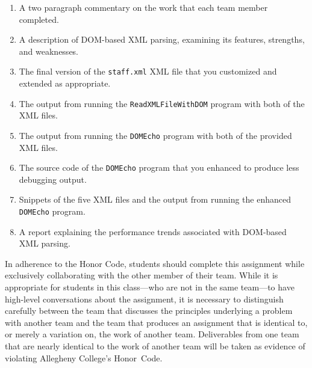 \vspace*{-.1in}
\begin{enumerate}
  \setlength{\itemsep}{0pt}
  \item A two paragraph commentary on the work that each team member completed. 
  \item A description of DOM-based XML parsing, examining its features, strengths, and weaknesses.
  \item The final version of the {\tt staff.xml} XML file that you customized and extended as appropriate.
  \item The output from running the {\tt ReadXMLFileWithDOM} program with both of the XML files.
  \item The output from running the {\tt DOMEcho} program with both of the provided XML files.
  \item The source code of the {\tt DOMEcho} program that you enhanced to produce less debugging output.
  \item Snippets of the five XML files and the output from running the enhanced {\tt DOMEcho} program.
  \item A report explaining the performance trends associated with DOM-based XML parsing.
\end{enumerate}
\vspace*{-.1in}

In adherence to the Honor Code, students should complete this assignment while exclusively collaborating with the
other member of their team. While it is appropriate for students in this class---who are not in the same team---to have
high-level conversations about the assignment, it is necessary to distinguish carefully between the team that discusses
the principles underlying a problem with another team and the team that produces an assignment that is identical to, or
merely a variation on, the work of another team.  Deliverables from one team that are nearly identical to the work of
another team will be taken as evidence of violating Allegheny College's \mbox{Honor Code}.



